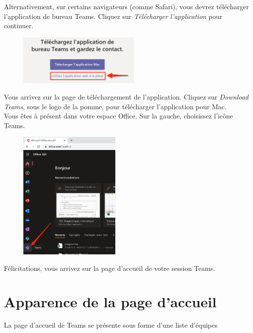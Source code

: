Alternativement, sur certains navigateurs (comme Safari), vous devrez télécharger l'application de bureau Teams. Cliquez sur \textit{Télécharger l'application} pour continuer.

\begin{figure}[h]
\includegraphics[width=6cm]{./images/teams/ecran_installer_teams_crop}
\centering
\end{figure}

Vous arrivez sur la page de téléchargement de l'application. Cliquez sur \textit{Download Teams}, sous le logo de la pomme, pour télécharger l'application pour Mac.\\

Vous êtes à présent dans votre espace Office. Sur la gauche, choisissez l'icône Teams.

\begin{figure}[H]
\includegraphics[width=5cm]{./images/teams/ecran_accueil_office_crop}
\centering
\end{figure}

Félicitations, vous arrivez sur la page d'accueil de votre session Teams.



\section{Apparence de la page d'accueil}

La page d'accueil de Teams se présente sous forme d'une liste d'équipes

